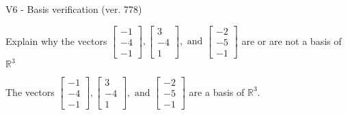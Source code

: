 \begin{exercise}
  \begin{exerciseTitle}V6 - Basis verification (ver. 778)\end{exerciseTitle}
  \begin{exerciseStatement}
    Explain why the vectors \(\left[\begin{array}{r}
-1 \\
-4 \\
-1
\end{array}\right] , \left[\begin{array}{r}
3 \\
-4 \\
1
\end{array}\right] , \text{ and } \left[\begin{array}{r}
-2 \\
-5 \\
-1
\end{array}\right]\) are or are not a basis of \(\mathbb{R}^3\)	


  \end{exerciseStatement}
  \begin{exerciseAnswer}
   The vectors \(\left[\begin{array}{r}
-1 \\
-4 \\
-1
\end{array}\right] , \left[\begin{array}{r}
3 \\
-4 \\
1
\end{array}\right] , \text{ and } \left[\begin{array}{r}
-2 \\
-5 \\
-1
\end{array}\right]\) 
  	 are  a basis of \(\mathbb{R}^3\).
  


  \end{exerciseAnswer}
\end{exercise}